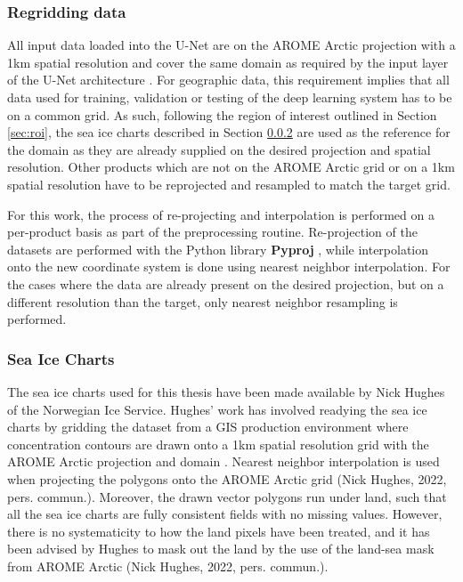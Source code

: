 \documentclass[../main/thesis]{subfiles}
\begin{document}
\subsubsection{Regridding data}
\label{sec:regrid}
All input data loaded into the U-Net are on the AROME Arctic projection with a 1km spatial resolution and cover the same domain as required by the input layer of the U-Net architecture \citep{Ronneberger2015}. For geographic data, this requirement implies that all data used for training, validation or testing of the deep learning system has to be on a common grid. As such, following the region of interest outlined in Section \ref{sec:roi}, the sea ice charts described in Section \ref{sec:data_seaicecharts} are used as the reference for the domain as they are already supplied on the desired projection and spatial resolution. Other products which are not on the AROME Arctic grid or on a 1km spatial resolution have to be reprojected and resampled to match the target grid.

For this work, the process of re-projecting and interpolation is performed on a per-product basis as part of the preprocessing routine. Re-projection of the datasets are performed with the Python library \textbf{Pyproj} \citep{Snow2022}, while interpolation onto the new coordinate system is done using nearest neighbor interpolation. For the cases where the data are already present on the desired projection, but on a different resolution than the target, only nearest neighbor resampling is performed.

\subsubsection{Sea Ice Charts}
\label{sec:data_seaicecharts}
The sea ice charts used for this thesis have been made available by Nick Hughes of the Norwegian Ice Service. Hughes' work has involved readying the sea ice charts by gridding the dataset from a GIS production environment \citep{Dinessen2020} where concentration contours are drawn onto a 1km spatial resolution grid with the AROME Arctic projection and domain \citep{Mueller2017}. Nearest neighbor interpolation is used when projecting the polygons onto the AROME Arctic grid (Nick Hughes, 2022, pers. commun.). Moreover, the drawn vector polygons run under land, such that all the sea ice charts are fully consistent fields with no missing values. However, there is no systematicity to how the land pixels have been treated, and it has been advised by Hughes to mask out the land by the use of the land-sea mask from AROME Arctic (Nick Hughes, 2022, pers. commun.).
\end{document}
